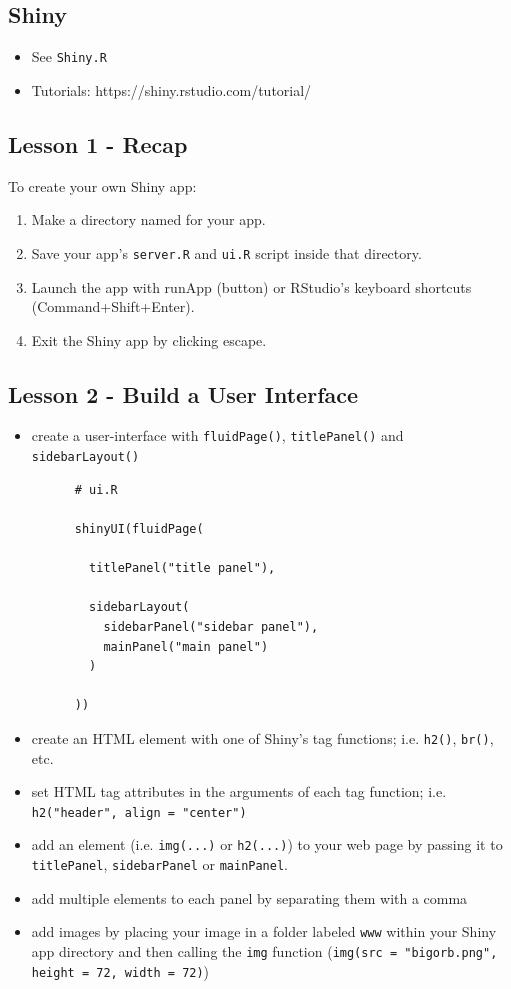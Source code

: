 \documentclass{article}
\begin{document}
\subsection*{Shiny}
  \begin{itemize}
  \item See \verb|Shiny.R|
  \item Tutorials: https://shiny.rstudio.com/tutorial/ 
  \end{itemize}
\subsection*{Lesson 1 - Recap}
To create your own Shiny app:
  \begin{enumerate}
  \item Make a directory named for your app.
  \item Save your app’s \verb|server.R| and \verb|ui.R| script inside that directory.
  \item Launch the app with runApp (button) or RStudio’s keyboard shortcuts (Command+Shift+Enter).
  \item Exit the Shiny app by clicking escape.
  \end{enumerate}
  
\subsection*{Lesson 2 - Build a User Interface}
\begin{itemize}
\item create a user-interface with \verb|fluidPage()|, \verb|titlePanel()| and \verb|sidebarLayout()|
          \begin{verbatim}
      # ui.R
      
      shinyUI(fluidPage(
      
        titlePanel("title panel"),
      
        sidebarLayout(
          sidebarPanel("sidebar panel"),
          mainPanel("main panel")
        )
        
      ))
            \end{verbatim}
\item create an HTML element with one of Shiny’s tag functions; i.e. \verb|h2()|, \verb|br()|, etc.
\item set HTML tag attributes in the arguments of each tag function; i.e. \verb|h2("header", align = "center")|
\item add an element (i.e. \verb|img(...)| or \verb|h2(...)|) to your web page by passing it to  \verb|titlePanel|,  \verb|sidebarPanel| or  \verb|mainPanel|.
\item add multiple elements to each panel by separating them with a comma
\item add images by placing your image in a folder labeled  \verb|www| within your Shiny app directory and then calling the  \verb|img| function (\verb|img(src = "bigorb.png", height = 72, width = 72)|)
\end{itemize}
\end{document}
